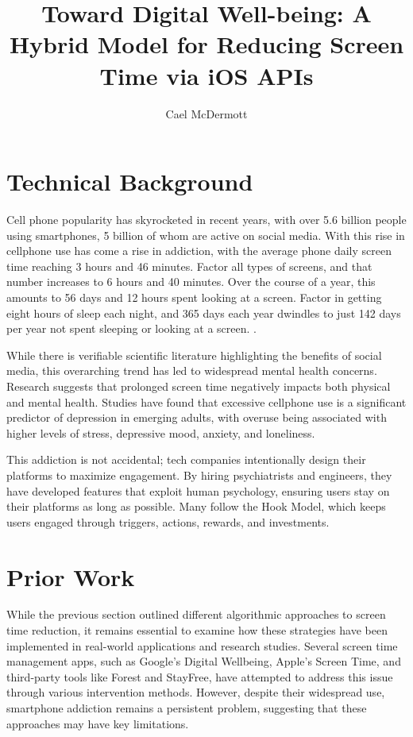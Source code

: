 \documentclass[10pt,twocolumn]{article}
\title{Toward Digital Well-being: A Hybrid Model for Reducing Screen Time via iOS APIs}
\author{Cael McDermott}
\affiliation{Occidental College}
\begin{document}
\maketitle

\section{Technical Background}

Cell phone popularity has skyrocketed in recent years, with over 5.6 billion people using smartphones, 5 billion of whom are active on social media. With this rise in cellphone use has come a rise in addiction, with the average phone daily screen time reaching 3 hours and 46 minutes.\cite{DigitalMediaMentalHealth} Factor all types of screens, and that number increases to 6 hours and 40 minutes. Over the course of a year, this amounts to 56 days and 12 hours spent looking at a screen. Factor in getting eight hours of sleep each night, and 365 days each year dwindles to just 142 days per year not spent sleeping or looking at a screen. \cite{ScreentimeMentalHealth}. 

While there is verifiable scientific literature highlighting the benefits of social media, this overarching trend has led to widespread mental health concerns. Research suggests that prolonged screen time negatively impacts both physical and mental health.\cite{ScreenTimeSleepQuality} Studies have found that excessive cellphone use is a significant predictor of depression in emerging adults, with overuse being associated with higher levels of stress, depressive mood, anxiety, and loneliness.\cite{ScreenTimeDepression}

This addiction is not accidental; tech companies intentionally design their platforms to maximize engagement. By hiring psychiatrists and engineers, they have developed features that exploit human psychology, ensuring users stay on their platforms as long as possible. Many follow the Hook Model, which keeps users engaged through triggers, actions, rewards, and investments.

\section{Prior Work}

While the previous section outlined different algorithmic approaches to screen time reduction, it remains essential to examine how these strategies have been implemented in real-world applications and research studies. Several screen time management apps, such as Google’s Digital Wellbeing, Apple’s Screen Time, and third-party tools like Forest and StayFree, have attempted to address this issue through various intervention methods.\cite{SmartphoneUseDepression} However, despite their widespread use, smartphone addiction remains a persistent problem, suggesting that these approaches may have key limitations. \cite{ReductionEqualsMentalHealthNoLooker}
\end{document}

